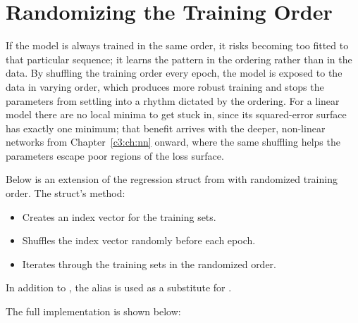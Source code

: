 
\section{Randomizing the Training Order}
\label{c2:sec:order}\label{c2:app:a}
If the model is always trained in the same order, it risks becoming too fitted to that particular
sequence; it learns the pattern in the ordering rather than in the data. By shuffling the training
order every epoch, the model is exposed to the data in varying order, which produces more robust
training and stops the parameters from settling into a rhythm dictated by the ordering. For a
linear model there are no local minima to get stuck in, since its squared-error surface has exactly
one minimum; that benefit arrives with the deeper, non-linear networks from
Chapter~\ref{c3:ch:nn} onward, where the same shuffling helps the parameters escape poor regions of
the loss surface.

Below is an extension of the regression struct from  with randomized training
order. The struct's  method:
\begin{itemize}
  \item Creates an index vector for the training sets.
  \item Shuffles the index vector randomly before each epoch.
  \item Iterates through the training sets in the randomized order.
\end{itemize}

\note[Note!] In addition to , the alias  is used as a substitute for
.

The full implementation is shown below:

